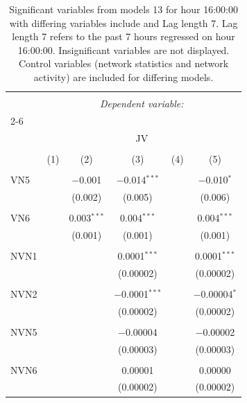 
\begin{table}[!htbp] \centering 
  \caption{Significant variables from models 13 for hour 16:00:00 with differing variables include 
                               and Lag length 7. Lag length 7 refers to the past 7 hours regressed on hour 16:00:00. 
                               Insignificant variables are not displayed. 
                               Control variables (network statistics and network activity) are 
                               included for differing models.} 
  \label{Jmodels1_t_hourlagged3} 
\scriptsize 
\begin{tabular}{@{\extracolsep{5pt}}lccccc} 
\\[-1.8ex]\hline 
\hline \\[-1.8ex] 
 & \multicolumn{5}{c}{\textit{Dependent variable:}} \\ 
\cline{2-6} 
\\[-1.8ex] & \multicolumn{5}{c}{JV} \\ 
\\[-1.8ex] & (1) & (2) & (3) & (4) & (5)\\ 
\hline \\[-1.8ex] 
 VN5 &  & $-$0.001 & $-$0.014$^{***}$ &  & $-$0.010$^{*}$ \\ 
  &  & (0.002) & (0.005) &  & (0.006) \\ 
  & & & & & \\ 
 VN6 &  & 0.003$^{***}$ & 0.004$^{***}$ &  & 0.004$^{***}$ \\ 
  &  & (0.001) & (0.001) &  & (0.001) \\ 
  & & & & & \\ 
 NVN1 &  &  & 0.0001$^{***}$ &  & 0.0001$^{***}$ \\ 
  &  &  & (0.00002) &  & (0.00002) \\ 
  & & & & & \\ 
 NVN2 &  &  & $-$0.0001$^{***}$ &  & $-$0.00004$^{*}$ \\ 
  &  &  & (0.00002) &  & (0.00002) \\ 
  & & & & & \\ 
 NVN5 &  &  & $-$0.00004 &  & $-$0.00002 \\ 
  &  &  & (0.00003) &  & (0.00003) \\ 
  & & & & & \\ 
 NVN6 &  &  & 0.00001 &  & 0.00000 \\ 
  &  &  & (0.00002) &  & (0.00002) \\ 

\end{tabular}
\end{table}

